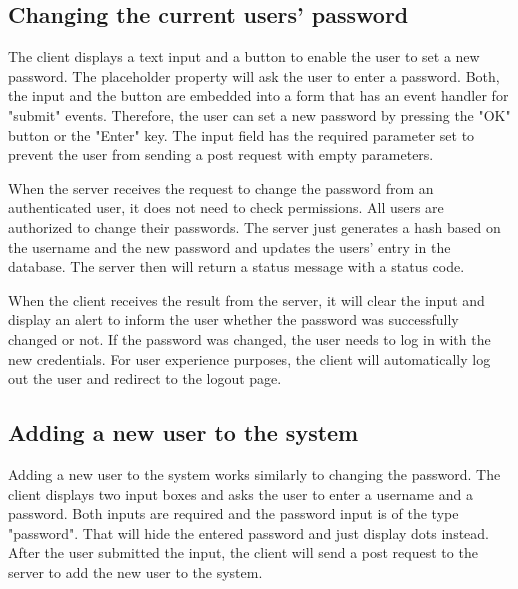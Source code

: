 \subsection{Changing the current users' password}
\label{subsec:changing_the_current_users_password}

The client displays a text input and a button to enable the user to set a new password. The placeholder property will ask the user to enter a password. Both, the input and the button are embedded into a form that has an event handler for "submit" events. Therefore, the user can set a new password by pressing the "OK" button or the "Enter" key.  The input field has the required parameter set to prevent the user from sending a post request with empty parameters.

When the server receives the request to change the password from an authenticated user, it does not need to check permissions. All users are authorized to change their passwords. The server just generates a hash based on the username and the new password and updates the users' entry in the database. The server then will return a status message with a status code.

When the client receives the result from the server, it will clear the input and display an alert to inform the user whether the password was successfully changed or not. If the password was changed, the user needs to log in with the new credentials. For user experience purposes, the client will automatically log out the user and redirect to the logout page.



\subsection{Adding a new user to the system}
\label{subsec:adding_a_new_user_to_the_system}

Adding a new user to the system works similarly to changing the password. The client displays two input boxes and asks the user to enter a username and a password. Both inputs are required and the password input is of the type "password". That will hide the entered password and just display dots instead. After the user submitted the input, the client will send a post request to the server to add the new user to the system.

